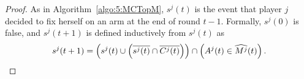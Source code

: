 \begin{proof}


  As in Algorithm~\ref{algo:5:MCTopM}, $s^j(t)$ is the event that player $j$ decided to fix herself on an arm at the end of round $t-1$.
  Formally, $s^j(0)$ is false, and $s^j(t+1)$ is defined inductively from $s^j(t)$ as
  \begin{equation}
      s^j(t+1) =
      \left( s^j(t) \cup \left( \overline{s^j(t)} \cap \overline{C^j(t)} \right) \right)
      \cap \left( A^j(t) \in \widehat{M^j}(t) \right).
  \end{equation}


\end{proof}
